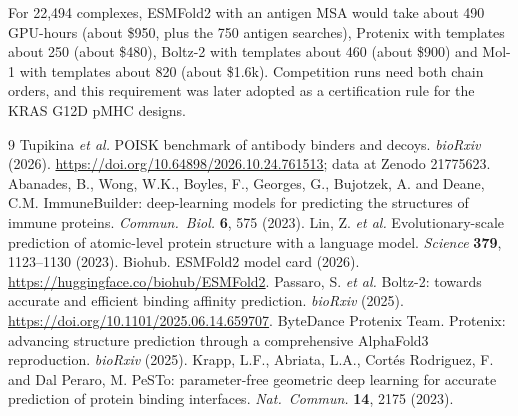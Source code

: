 \documentclass[11pt,a4paper]{article}
\begin{document}
For 22,494 complexes, ESMFold2 with an antigen MSA would take about 490 GPU-hours (about \$950, plus the 750 antigen searches), Protenix with templates about 250 (about \$480), Boltz-2 with templates about 460 (about \$900) and Mol-1 with templates about 820 (about \$1.6k).
Competition runs need both chain orders, and this requirement was later adopted as a certification rule for the KRAS G12D pMHC designs.

\begin{thebibliography}{9}
 Tupikina \emph{et al.} POISK benchmark of antibody binders and decoys. \emph{bioRxiv} (2026). \url{https://doi.org/10.64898/2026.10.24.761513}; data at Zenodo 21775623.
 Abanades, B., Wong, W.K., Boyles, F., Georges, G., Bujotzek, A. and Deane, C.M. ImmuneBuilder: deep-learning models for predicting the structures of immune proteins. \emph{Commun.\ Biol.} \textbf{6}, 575 (2023).
 Lin, Z. \emph{et al.} Evolutionary-scale prediction of atomic-level protein structure with a language model. \emph{Science} \textbf{379}, 1123--1130 (2023).
 Biohub. ESMFold2 model card (2026). \url{https://huggingface.co/biohub/ESMFold2}.
 Passaro, S. \emph{et al.} Boltz-2: towards accurate and efficient binding affinity prediction. \emph{bioRxiv} (2025). \url{https://doi.org/10.1101/2025.06.14.659707}.
 ByteDance Protenix Team. Protenix: advancing structure prediction through a comprehensive AlphaFold3 reproduction. \emph{bioRxiv} (2025).
 Krapp, L.F., Abriata, L.A., Cort\'es Rodriguez, F. and Dal Peraro, M. PeSTo: parameter-free geometric deep learning for accurate prediction of protein binding interfaces. \emph{Nat.\ Commun.} \textbf{14}, 2175 (2023).
\end{thebibliography}
\end{document}
